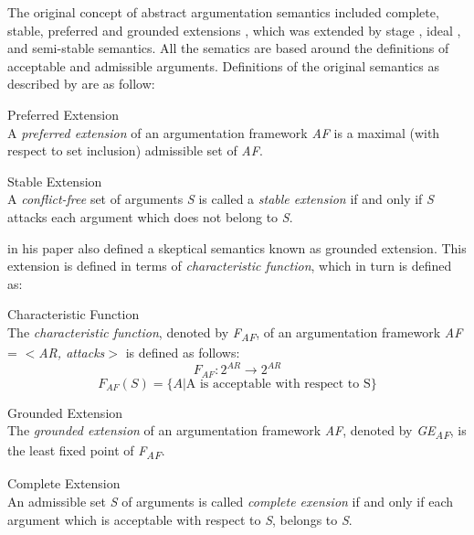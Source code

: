 The original concept of abstract argumentation semantics included complete, stable, preferred and grounded extensions \citep{dung1995}, which was extended by stage \citep{verheij1996two}, ideal \citep{dung2007computing}, and semi-stable \citep{caminada2006semi} semantics. All the sematics are based around the definitions of acceptable and admissible arguments. Definitions of the original semantics as described by \citet{dung1995} are as follow: 

\begin{definition}{Preferred Extension}
\label{def:preferredExtension}\\
A \textit{preferred extension} of an argumentation framework \textit{AF} is a maximal (with respect to set inclusion) admissible set of \textit{AF}.
\end{definition}

\begin{definition}{Stable Extension}
\label{def:stableExtension}\\
A \textit{conflict-free} set of arguments \textit{S} is called a \textit{stable extension} if and only if \textit{S} attacks each argument which does not belong to \textit{S}.
\end{definition}

\citet{dung1995} in his paper also defined a skeptical semantics known as grounded extension. This extension is defined in terms of \textit{characteristic function}, which in turn is defined as:

\begin{definition}{Characteristic Function}
\label{def:characteristicFunction}\\
The \textit{characteristic function}, denoted by \textit{F\textsubscript{AF}}, of an argumentation framework \textit{AF} = $<$\textit{AR, attacks}$>$ is defined as follows:
\[F_{AF}:2^{AR} \rightarrow 2^{AR}\]
\[F_{AF}(S)=\{A| \text{A is acceptable with respect to S} \}\]
\end{definition}

\begin{definition}{Grounded Extension}
\label{def:groundedExtension}\\
The \textit{grounded extension} of an argumentation framework \textit{AF}, denoted by \textit{GE\textsubscript{AF}}, is the least fixed point of \textit{F\textsubscript{AF}}.
\end{definition}

\begin{definition}{Complete Extension}
\label{def:completeExtension}\\
An admissible set \textit{S} of arguments is called \textit{complete exension} if and only if each argument which is acceptable with respect to \textit{S}, belongs to \textit{S}.
\end{definition}

